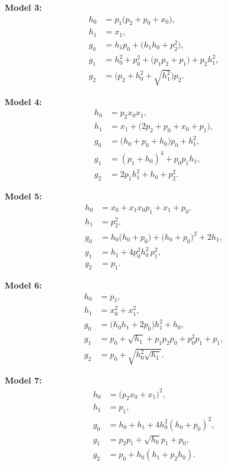 \documentclass[14pt]{extarticle}
\begin{document}
    \textbf{Model 3:}
    \begin{align*}
    h_0 &= p_1\bigl(p_2 + p_0 + x_0\bigr),\\
    h_1 &= x_1,\\
    g_0 &= h_1p_0 + \bigl(h_1h_0 + p_2^2\bigr),\\
    g_1 &= h_0^2 + p_0^2 + \bigl(p_1p_2 + p_1\bigr) + p_2h_1^2,\\
    g_2 &= \bigl(p_2 + h_0^2 + \sqrt{h_1^2}\bigr)p_2.
    \end{align*}
    
    \textbf{Model 4:}
    \begin{align*}
    h_0 &= p_2x_0x_1,\\
    h_1 &= x_1 + \bigl(2p_2 + p_0 + x_0 + p_1\bigr),\\
    g_0 &= \bigl(h_0 + p_0 + h_0\bigr)p_0 + h_1^2,\\
    g_1 &= (p_1 + h_0)^4 + p_0p_1h_1,\\
    g_2 &= 2p_1h_1^2 + h_0 + p_2^2.
    \end{align*}
    
    \textbf{Model 5:}
    \begin{align*}
    h_0 &= x_0 + x_1x_0p_1 + x_1 + p_0,\\
    h_1 &= p_2^2,\\
    g_0 &= h_0\bigl(h_0 + p_0\bigr) + \bigl(h_0 + p_0\bigr)^2 + 2h_1,\\
    g_1 &= h_1 + 4p_0^2h_0^2\,p_1^2,\\
    g_2 &= p_1.
    \end{align*}

    \textbf{Model 6:}
    \begin{align*}
    h_0 &= p_1,\\
    h_1 &= x_0^2 + x_1^2,\\
    g_0 &= \bigl(h_0h_1 + 2p_0\bigr)h_1^2 + h_0,\\
    g_1 &= p_0 + \sqrt{h_1} + p_1p_2p_0 + p_0^2p_1 + p_1,\\
    g_2 &= p_0 + \sqrt{h_0^2\sqrt{h_1}}.
    \end{align*}
    
    \textbf{Model 7:}
    \begin{align*}
    h_0 &= \bigl(p_2x_0 + x_1\bigr)^2,\\
    h_1 &= p_1,\\
    g_0 &= h_0 + h_1 + 4h_0^2(h_0 + p_0)^2,\\
    g_1 &= p_2p_1 + \sqrt{h_0}p_1 + p_0,\\
    g_2 &= p_0 + h_0(h_1 + p_2h_0).
    \end{align*}
    
\end{document}
